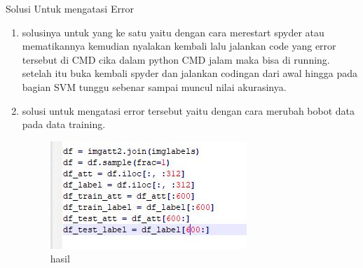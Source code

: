Solusi Untuk mengatasi Error
\begin{enumerate}
\item solusinya untuk yang ke satu yaitu dengan cara merestart spyder atau mematikannya kemudian nyalakan kembali lalu jalankan code yang error tersebut di CMD cika dalam python CMD jalam maka bisa di running. setelah itu buka kembali spyder dan jalankan codingan dari awal hingga pada bagian SVM tunggu sebenar sampai muncul nilai akurasinya.
\item solusi untuk mengatasi error tersebut yaitu dengan cara merubah bobot data pada data training.
\begin{figure}[ht]
\centering
\includegraphics[scale=0.5]{figures/1174051/3/plagiat/plagiat.JPG}
\caption{hasil}
\label{contoh}
\end{figure}
\end{enumerate}